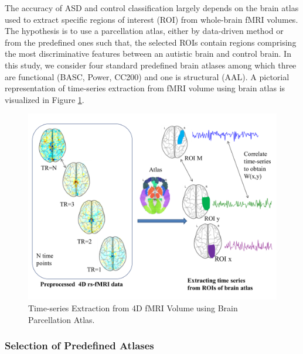 The accuracy of ASD and control classification largely depends on the brain atlas used to
extract specific regions of interest (ROI) from whole-brain fMRI volumes. The hypothesis is
to use a parcellation atlas, either by data-driven method or from the predefined ones such
that, the selected ROIs contain regions comprising the most discriminative features between
an autistic brain and control brain. In this study, we consider four standard predefined brain
atlases among which three are functional (BASC, Power, CC200) and one is structural
(AAL). A pictorial representation of time-series extraction from fMRI volume using brain
atlas is visualized in Figure \ref{fig:3.2}.\\
\newpage
\begin{figure}[h]
\centering
\includegraphics[width = \textwidth]{figures/Figure 3.2.png}
\caption{Time-series Extraction from 4D fMRI Volume using Brain Parcellation Atlas.}
\label{fig:3.2}
\end{figure}

\subsubsection{Selection of Predefined Atlases}

